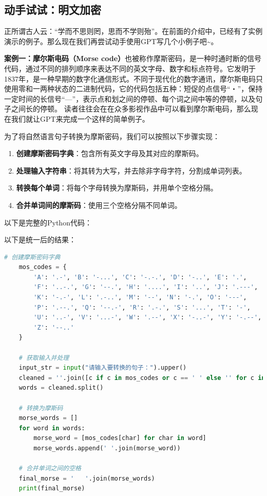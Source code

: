 \subsection{动手试试：明文加密}

正所谓古人云：``学而不思则罔，思而不学则殆''。在前面的介绍中，已经有了实例演示的例子。那么现在我们再尝试动手使用GPT写几个小例子吧\textasciitilde{}。

\textbf{案例一：摩尔斯电码（Morse code）}也被称作摩斯密码，是一种时通时断的信号代码，通过不同的排列顺序来表达不同的英文字母、数字和标点符号。它发明于1837年，是一种早期的数字化通信形式。不同于现代化的数字通讯，摩尔斯电码只使用零和一两种状态的二进制代码，它的代码包括五种：短促的点信号``・''，保持一定时间的长信号``---''，表示点和划之间的停顿、每个词之间中等的停顿，以及句子之间长的停顿。
读者往往会在在众多影视作品中可以看到摩尔斯电码，那么现在我们就让GPT来完成一个这样的简单例子。


\begin{gptbox}
\footnotesize{为了将自然语言句子转换为摩斯密码，我们可以按照以下步骤实现：

\begin{enumerate}
  \def\labelenumi{\arabic{enumi}.}
  \item
        \textbf{创建摩斯密码字典}：包含所有英文字母及其对应的摩斯码。
  \item
        \textbf{处理输入字符串}：将其转为大写，并去除非字母字符，分割成单词列表。
  \item
        \textbf{转换每个单词}：将每个字母转换为摩斯码，并用单个空格分隔。
  \item
        \textbf{合并单词间的摩斯码}：使用三个空格分隔不同单词。
\end{enumerate}
以下是完整的Python代码：
}
\small{
以下是统一后的结果：
\begin{lstlisting}[language=Python]
    # 创建摩斯密码字典
    mos_codes = {
        'A': '.-', 'B': '-...', 'C': '-.-.', 'D': '-..', 'E': '.', 
        'F': '..-.', 'G': '--.', 'H': '....', 'I': '..', 'J': '.---', 
        'K': '-.-', 'L': '.-..', 'M': '--', 'N': '-.', 'O': '---', 
        'P': '.--.', 'Q': '--.-', 'R': '.-.', 'S': '...', 'T': '-', 
        'U': '..-', 'V': '...-', 'W': '.--', 'X': '-..-', 'Y': '-.--', 
        'Z': '--..'
    }
    
    # 获取输入并处理
    input_str = input("请输入要转换的句子：").upper()
    cleaned = ''.join([c if c in mos_codes or c == ' ' else '' for c in input_str])
    words = cleaned.split()
    
    # 转换为摩斯码
    morse_words = []
    for word in words:
        morse_word = [mos_codes[char] for char in word]
        morse_words.append(' '.join(morse_word))
    
    # 合并单词之间的空格
    final_morse = '   '.join(morse_words)
    print(final_morse)
\end{lstlisting}
}
\end{gptbox}


